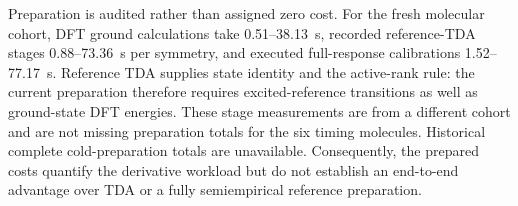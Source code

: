 Preparation is audited rather than assigned zero cost. For the fresh molecular cohort, DFT ground calculations take 0.51--38.13~s, recorded reference-TDA stages 0.88--73.36~s per symmetry, and executed full-response calibrations 1.52--77.17~s. Reference TDA supplies state identity and the active-rank rule: the current preparation therefore requires excited-reference transitions as well as ground-state DFT energies. These stage measurements are from a different cohort and are not missing preparation totals for the six timing molecules. Historical complete cold-preparation totals are unavailable. Consequently, the prepared costs quantify the derivative workload but do not establish an end-to-end advantage over TDA or a fully semiempirical reference preparation.
